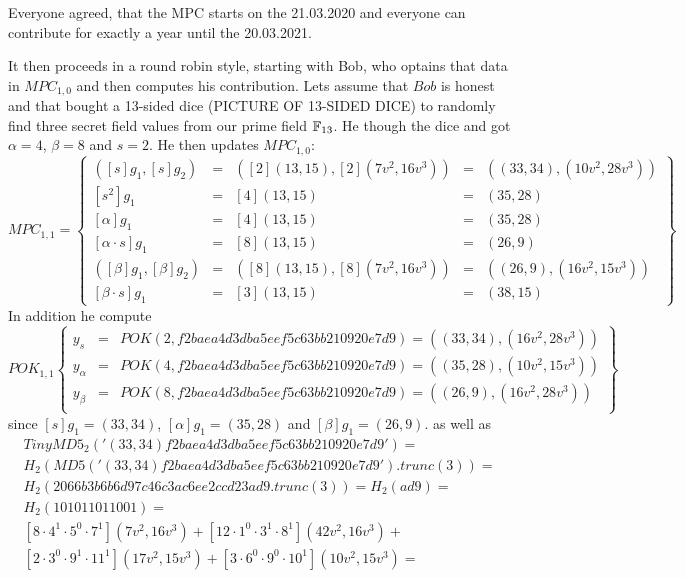\begin{example}
Everyone agreed, that the MPC starts on the 21.03.2020 and everyone can contribute for exactly a year until the 20.03.2021. 


  
It then proceeds in a round robin style, starting with Bob, who optains that data in $MPC_{1,0}$ and then computes his contribution. Lets assume that $Bob$ is honest and that bought 
a 13-sided dice (PICTURE OF 13-SIDED DICE) to randomly find three secret field values from our prime field $\mathbb{F}_{13}$. He though the dice and got $\alpha = 4$, $\beta=8$ and $s= 2$. He then updates $MPC_{1,0}$:  
$$
MPC_{1,1}= \left\{
\begin{array}{lclcl}
([s]g_1, [s]g_2) &=& ([2](13,15),[2](7v^2,16v^3)) &=& ((33,34),(10v^2,28v^3))\\ 
{}[s^2] g_1 &=& [4](13,15)&=& (35,28)\\
{}[\alpha]g_1 &=& [4](13,15)&=& (35,28)\\ 
{}[\alpha\cdot s]g_1 &=& [8](13,15) &=& (26,9)\\ 
([\beta]g_1,[\beta]g_2) &=& ([8](13,15),[8](7v^2,16v^3))&=& ((26,9),(16v^2,15v^3))\\ 
{}[\beta \cdot s]g_1 &=& [3](13,15)&=& (38,15)
\end{array}
\right\}
$$
In addition he compute 
$$
POK_{1,1} \left\{
\begin{array}{lcl}
y_{s} &=& POK(2, f2baea4d3dba5eef5c63bb210920e7d9) = ((33,34),(16v^2 , 28v^3))\\
y_{\alpha} &=& POK(4, f2baea4d3dba5eef5c63bb210920e7d9) = ((35,28),(10v^2 , 15v^3))\\ 
y_{\beta} &=& POK(8, f2baea4d3dba5eef5c63bb210920e7d9) = ((26,9),(16v^2 , 28v^3))\\
\end{array}
\right\}
$$
since $[s]g_1 = (33,34)$, $[\alpha] g_1 = (35,28)$ and $[\beta] g_1 = (26,9)$. as well as 
\begin{align*}
TinyMD5_{2}('(33,34)f2baea4d3dba5eef5c63bb210920e7d9') =\\ H_2(MD5('(33,34)f2baea4d3dba5eef5c63bb210920e7d9').trunc(3))=\\ H_2(2066b3b6b6d97c46c3ac6ee2ccd23ad9.trunc(3))= H_2(ad9) = \\
H_2(101 011 011 001)=\\
[8\cdot 4^{1}\cdot 5^{0}\cdot 7^{1}](7v^2 , 16v^3)+
[12\cdot 1^{0}\cdot 3^{1}\cdot 8^{1}](42v^2 , 16v^3 )+\\
[2\cdot 3^{0}\cdot 9^{1}\cdot 11^{1}](17v^2 , 15v^3 ) +
[3\cdot 6^{0}\cdot 9^{0}\cdot 10^{1}](10v^2 , 15v^3 ) =\\

\end{align*}
\end{example}
